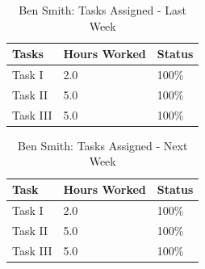 \documentclass[12pt,journal]{IEEEtran}
\begin{document}
	\begin{table}[H]
	\renewcommand{\arraystretch}{1.3}
		\caption{Ben Smith: Tasks Assigned - Last Week}
		
		\label{Summary of Ben Smith's activities: last week}
		
		\centering
		\begin{tabular}{p{5cm}|p{1cm}|p{1cm}}

		\hline
		\bfseries 	Tasks					        							& \bfseries Hours Worked	& \bfseries Status	\\
		\hline\hline
                Task I 					 	            			& 2.0                   	& 100\%             \\
                Task II 														& 5.0                   	& 100\%             \\
                Task III														& 5.0                   	& 100\%             \\
		\hline
		\end{tabular}
	\end{table}

	\begin{table}[H]
	\renewcommand{\arraystretch}{1.3}
		\caption{Ben Smith: Tasks Assigned - Next Week}
		
		\label{Summary of Ben Smith's activites: this week}
		
		\centering
		\begin{tabular}{p{5cm}|p{1cm}|p{1cm}}

		\hline
		\bfseries 	Task	 		           	 					& \bfseries Hours Worked	& \bfseries Status			\\
		\hline\hline
                Task I 					 	            			& 2.0                   	& 100\%             \\
                Task II 														& 5.0                   	& 100\%             \\
                Task III														& 5.0                   	& 100\%             \\
		\hline
		\end{tabular}
	\end{table}
\end{document}
